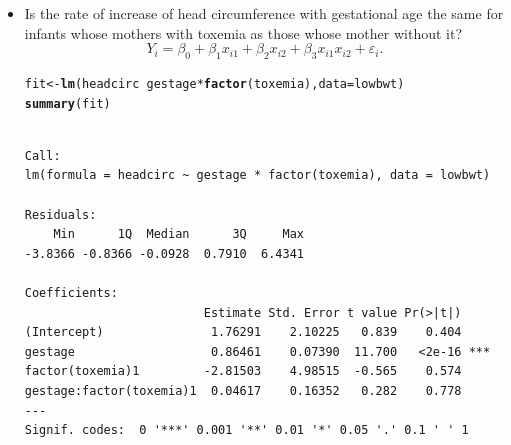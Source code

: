 \documentclass[final]{article}\usepackage[]{graphicx}\usepackage[svgnames]{xcolor}
\makeatletter
\newcommand{\hlopt}[1]{\textcolor[rgb]{0,0,0}{#1}}%
\newcommand{\hlstd}[1]{\textcolor[rgb]{0.345,0.345,0.345}{#1}}%
\newcommand{\hlkwb}[1]{\textcolor[rgb]{0.69,0.353,0.396}{#1}}%
\newcommand{\hlkwc}[1]{\textcolor[rgb]{0.333,0.667,0.333}{#1}}%
\newcommand{\hlkwd}[1]{\textcolor[rgb]{0.737,0.353,0.396}{\textbf{#1}}}%
\newenvironment{kframe}{%
 \def\at@end@of@kframe{}%
 \ifinner\ifhmode%
  \def\at@end@of@kframe{\end{minipage}}%
  \begin{minipage}{\columnwidth}%
 \fi\fi%
 \def\FrameCommand##1{\hskip\@totalleftmargin \hskip-\fboxsep
 \colorbox{shadecolor}{##1}\hskip-\fboxsep
     \hskip-\linewidth \hskip-\@totalleftmargin \hskip\columnwidth}%
 \MakeFramed {\advance\hsize-\width
   \@totalleftmargin\z@ \linewidth\hsize
   \@setminipage}}%
 {\par\unskip\endMakeFramed%
 \at@end@of@kframe}
\newenvironment{knitrout}{}{} %
\newcommand{\HN}{\text{H}_0}%
\makeatother
\begin{document}
\begin{itemize}
\begin{knitrout}
\begin{kframe}
\begin{verbatim}
Call:
lm(formula = headcirc ~ gestage + factor(toxemia), data = lowbwt)

Residuals:
    Min      1Q  Median      3Q     Max 
-3.8427 -0.8427 -0.0525  0.8109  6.4092 

Coefficients:
                 Estimate Std. Error t value Pr(>|t|)    
(Intercept)       1.49558    1.86799   0.801  0.42530    
gestage           0.87404    0.06561  13.322  < 2e-16 ***
factor(toxemia)1 -1.41233    0.40615  -3.477  0.00076 ***
---
Signif. codes:  0 '***' 0.001 '**' 0.01 '*' 0.05 '.' 0.1 ' ' 1

Residual standard error: 1.507 on 97 degrees of freedom
Multiple R-squared:  0.6528,	Adjusted R-squared:  0.6456 
F-statistic: 91.18 on 2 and 97 DF,  p-value: < 2.2e-16
\end{verbatim}
\end{kframe}
\end{knitrout}
          What is the interpretation of $ \beta_2 $?

          $ \hat{\beta}_3=-1.41233 $. After adjustment of gestational age, the babies whose mothers had toxemia have smaller (by \qty{1.41}{\cm}) than
          those whose mothers did not. This difference is significant (test $ \HN $: $ \beta_2=0 $, $ p\text{-value}=0.0076<0.05$).
    \item Is the rate of increase of head circumference with gestational age the same
          for infants whose mothers with toxemia as those whose mother without it?
          \[ Y_i=\beta_0+\beta_1x_{i1}+\beta_2x_{i2}+\beta_3x_{i1}x_{i2}+\varepsilon_i. \]
\begin{knitrout}
\color{fgcolor}\begin{kframe}
\begin{alltt}
\hlstd{fit} \hlkwb{<-} \hlkwd{lm}\hlstd{(headcirc} \hlopt{~} \hlstd{gestage} \hlopt{*} \hlkwd{factor}\hlstd{(toxemia),} \hlkwc{data} \hlstd{= lowbwt)}
\hlkwd{summary}\hlstd{(fit)}
\end{alltt}
\begin{verbatim}

Call:
lm(formula = headcirc ~ gestage * factor(toxemia), data = lowbwt)

Residuals:
    Min      1Q  Median      3Q     Max 
-3.8366 -0.8366 -0.0928  0.7910  6.4341 

Coefficients:
                         Estimate Std. Error t value Pr(>|t|)    
(Intercept)               1.76291    2.10225   0.839    0.404    
gestage                   0.86461    0.07390  11.700   <2e-16 ***
factor(toxemia)1         -2.81503    4.98515  -0.565    0.574    
gestage:factor(toxemia)1  0.04617    0.16352   0.282    0.778    
---
Signif. codes:  0 '***' 0.001 '**' 0.01 '*' 0.05 '.' 0.1 ' ' 1


\end{verbatim}
\end{kframe}
\end{knitrout}
\end{itemize}
\end{document}
